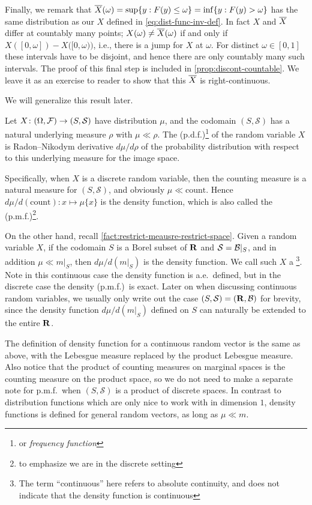 Finally, we remark that $\overline{X}(\omega) = \sup\{y:F(y)\leq \omega\} = \inf\{y:F(y) > \omega\}$ has the same distribution as our $X$ defined in \eqref{eq:dist-func-inv-def}. In fact $X$ and $\overline{X}$ differ at countably many points; $X(\omega) \neq \overline{X}(\omega)$ if and only if $X([0,\omega]) - X\bigl([0,\omega)\bigr)$, i.e., there is a jump for $X$ at $\omega$. For distinct $\omega\in [0,1]$ these intervals have to be disjoint, and hence there are only countably many such intervals. The proof of this final step is included in \cref{prop:discont-countable}. We leave it as an exercise to reader to show that this $\overline{X}$ is right-continuous.

We will generalize this result later.

Let $X\colon (\Omega,\mathcal{F})\to (S,\mathcal S)$ have distribution $\mu$, and the codomain $(S,\mathcal S)$ has a natural underlying measure $\rho$ with $\mu \ll \rho$. The  (p.d.f.)\footnote{or \emph{frequency function}} of the random variable $X$ is Radon--Nikodym derivative $d\mu/d\rho$ of the probability distribution with respect to this underlying measure for the image space.

Specifically, when $X$ is a discrete random variable, then the counting measure is a natural measure for $(S,\mathcal S)$, and obviously $\mu \ll \mathrm{count}$. Hence $d\mu/d(\mathrm{count})\colon x \mapsto \mu\{x\}$ is the density function, which is also called the  (p.m.f.)\footnote{to emphasize we are in the discrete setting}.

On the other hand, recall \cref{fact:restrict-meausre-restrict-space}. Given a random variable $X$, if the codomain $S$ is a Borel subset of $\mathbf{R}$ and $\mathcal S = \mathcal{B}|_S$, and in addition $\mu \ll m|_S$, then $d\mu/d(m|_S)$ is the density function. We call such $X$ a \footnote{The term ``continuous'' here refers to absolute continuity, and does not indicate that the density function is continuous}. Note in this continuous case the density function is a.e.\ defined, but in the discrete case the density (p.m.f.)\ is exact. Later on when discussing continuous random variables, we usually only write out the case $(S,\mathcal{S}) = (\mathbf{R},\mathcal{B})$ for brevity, since the density function $d\mu / d(m|_S)$ defined on $S$ can naturally be extended to the entire $\mathbf{R}$.

The definition of density function for a continuous random vector is the same as above, with the Lebesgue measure replaced by the product Lebesgue measure. Also notice that the product of counting measures on marginal spaces is the counting measure on the product space, so we do not need to make a separate note for p.m.f.\ when $(S,\mathcal S)$ is a product of discrete spaces. In contrast to distribution functions which are only nice to work with in dimension $1$, density functions is defined for general random vectors, as long as $\mu \ll m$.

